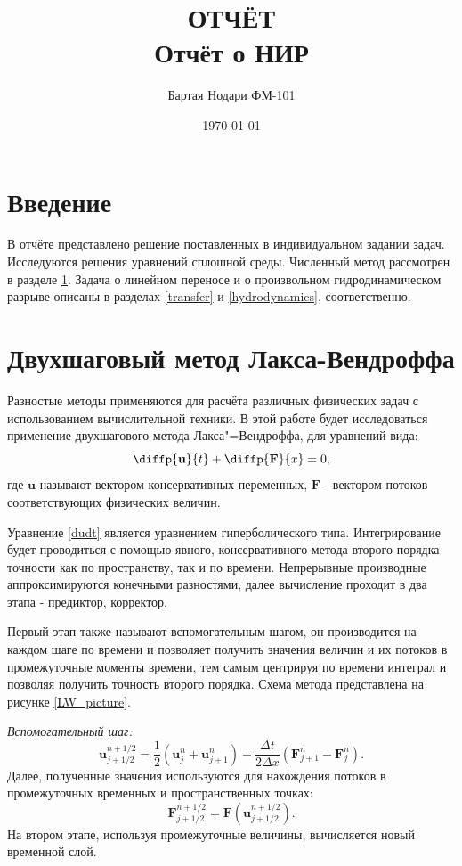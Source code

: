 \documentclass[a4paper]{article}
\author{Бартая Нодари ФМ-101}
\title{ОТЧЁТ\\ Отчёт о НИР}
\date{\today}
\begin{document}
	\section*{Введение}
	В отчёте представлено решение поставленных в индивидуальном задании задач. Исследуются решения уравнений сплошной среды. Численный метод рассмотрен в разделе \ref{Lax-Wendroff}. 
	Задача о линейном переносе и о произвольном гидродинамическом разрыве описаны в разделах \ref{transfer} и \ref{hydrodynamics}, соответственно.
	
	\section{Двухшаговый метод Лакса-Вендроффа}\label{Lax-Wendroff}
	Разностые методы применяются для расчёта различных физических задач с использованием вычислительной техники. В этой работе будет исследоваться применение двухшагового метода Лакса"=Вендроффа, для уравнений вида: 
	\begin{equation}\label{dudt}
	\diffp{\mathbf{u}}{t} + \diffp{\mathbf{F}}{x} = 0 ,
	\end{equation}
	где $\mathbf{u}$ называют вектором консервативных переменных, $\mathbf{F}$ - вектором потоков соответствующих физических величин.
	
	Уравнение \ref{dudt} является уравнением гиперболического типа. Интегрирование будет проводиться с помощью явного, консервативного метода второго порядка точности как по пространству, так и по времени. Непрерывные производные аппроксимируются конечными разностями, далее вычисление проходит в два этапа - предиктор, корректор. 
	
	Первый этап также называют вспомогательным шагом, он производится на каждом шаге по времени и позволяет получить значения величин и их потоков в промежуточные моменты времени, тем самым центрируя по времени интеграл и позволяя получить точность второго порядка. Схема метода представлена на рисунке \ref{LW_picture}.
		
	\textit{Вспомогательный шаг:}
	\begin{equation}\label{LW_helper}
	\mathbf{u}_{j+1/2}^{n+1/2} = \frac{1}{2} \left(\mathbf{u}_{j}^{n} + \mathbf{u}_{j+1}^{n}\right)
	- \frac{\Delta t}{2 \Delta x}
	\left(\mathbf{F}_{j+1}^{n} - \mathbf{F}_{j}^{n}\right) .
	\end{equation}
	Далее, полученные значения используются для нахождения потоков в промежуточных временных и пространственных точках:
	\begin{equation}\label{LW_flow}
	\mathbf{F}_{j+1/2}^{n+1/2} = \mathbf{F} \left( \mathbf{u}_{j+1/2}^{n+1/2} \right).
	\end{equation}
	На втором этапе, используя промежуточные величины, вычисляется новый временной слой.
	
\end{document}
